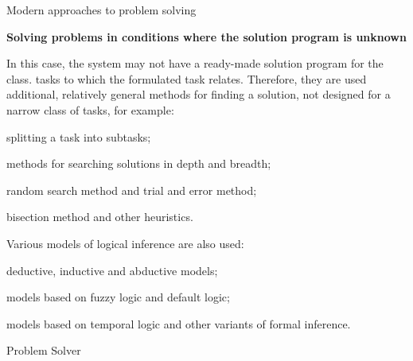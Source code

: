 \begin{frame}{Modern approaches to problem solving}
	\topline
	\justifying
	\vspace*{\fill}
	
	\footnotesize
	
	\vspace{2mm}
	\textbf{Solving problems in conditions where the solution program is unknown}
	
	\vspace{1mm}
	In this case, the system may not have a ready-made solution program for the class.
	tasks to which the formulated task relates. Therefore, they are used
	additional, relatively general methods for finding a solution, not
	designed for a narrow class of tasks, for example:
	\begin{textitemize}
		\item splitting a task into subtasks;
		\item methods for searching solutions in depth and breadth;
		\item random search method and trial and error method;
		\item bisection method and other heuristics.
	\end{textitemize}
	
	Various models of logical inference are also used:
	\begin{textitemize}
		\item deductive, inductive and abductive models;
		\item models based on fuzzy logic and default logic;
		\item models based on temporal logic and other variants of formal inference.
	\end{textitemize}
	
\end{frame}

\begin{frame}{Problem Solver}
	\topline
	\justifying
	
	\begin{SCn}
	\end{SCn}
\end{frame}

